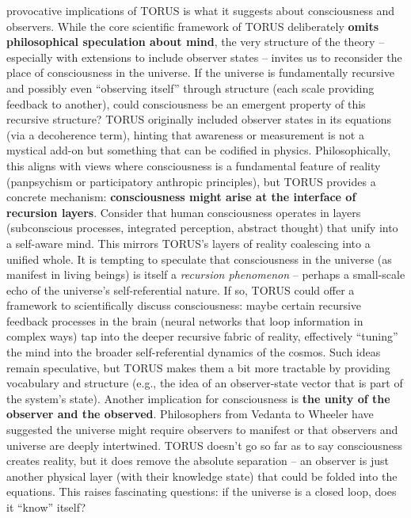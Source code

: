 \begin{itemize}
  provocative implications of TORUS is what it suggests about
  consciousness and observers. While the core scientific framework of
  TORUS deliberately \textbf{omits philosophical speculation about
  mind}​, the very structure of the theory -- especially with extensions
  to include observer states -- invites us to reconsider the place of
  consciousness in the universe. If the universe is fundamentally
  recursive and possibly even ``observing itself'' through structure
  (each scale providing feedback to another), could consciousness be an
  emergent property of this recursive structure? TORUS originally
  included observer states in its equations (via a decoherence term)​,
  hinting that awareness or measurement is not a mystical add-on but
  something that can be codified in physics. Philosophically, this
  aligns with views where consciousness is a fundamental feature of
  reality (panpsychism or participatory anthropic principles), but TORUS
  provides a concrete mechanism: \textbf{consciousness might arise at
  the interface of recursion layers}. Consider that human consciousness
  operates in layers (subconscious processes, integrated perception,
  abstract thought) that unify into a self-aware mind. This mirrors
  TORUS's layers of reality coalescing into a unified whole. It is
  tempting to speculate that consciousness in the universe (as manifest
  in living beings) is itself a \emph{recursion phenomenon} -- perhaps a
  small-scale echo of the universe's self-referential nature. If so,
  TORUS could offer a framework to scientifically discuss consciousness:
  maybe certain recursive feedback processes in the brain (neural
  networks that loop information in complex ways) tap into the deeper
  recursive fabric of reality, effectively ``tuning'' the mind into the
  broader self-referential dynamics of the cosmos. Such ideas remain
  speculative, but TORUS makes them a bit more tractable by providing
  vocabulary and structure (e.g., the idea of an observer-state vector
  that is part of the system's state). Another implication for
  consciousness is \textbf{the unity of the observer and the observed}.
  Philosophers from Vedanta to Wheeler have suggested the universe might
  require observers to manifest or that observers and universe are
  deeply intertwined. TORUS doesn't go so far as to say consciousness
  creates reality, but it does remove the absolute separation -- an
  observer is just another physical layer (with their knowledge state)
  that could be folded into the equations. This raises fascinating
  questions: if the universe is a closed loop, does it ``know'' itself?

\end{itemize}
